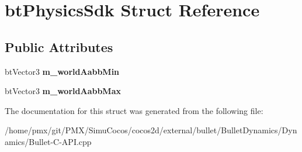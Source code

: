\hypertarget{structbtPhysicsSdk}{}\section{bt\+Physics\+Sdk Struct Reference}
\label{structbtPhysicsSdk}
\subsection*{Public Attributes}
\begin{DoxyCompactItemize}
\item 
\mbox{\label{structbtPhysicsSdk_a734b85b46612cc8a0889e69d7389a21b}} 
bt\+Vector3 {\bfseries m\+\_\+world\+Aabb\+Min}
\item 
\mbox{\label{structbtPhysicsSdk_adb2daf1fbfb76a2e0cd8fc338a62b128}} 
bt\+Vector3 {\bfseries m\+\_\+world\+Aabb\+Max}
\end{DoxyCompactItemize}


The documentation for this struct was generated from the following file\+:\begin{DoxyCompactItemize}
\item 
/home/pmx/git/\+P\+M\+X/\+Simu\+Cocos/cocos2d/external/bullet/\+Bullet\+Dynamics/\+Dynamics/Bullet-\/\+C-\/\+A\+P\+I.\+cpp\end{DoxyCompactItemize}
